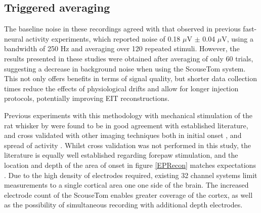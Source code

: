 \subsection{Triggered averaging}
The baseline noise in these recordings agreed with that observed in previous fast-neural activity experiments, which reported noise of 0.18 $\mu$V $\pm$ 0.04 $\mu$V, using a bandwidth of 250 Hz \cite{Oh2011,Packham2016} and averaging over 120 repeated stimuli. However, the results presented in these studies were obtained after averaging of only 60 trials, suggesting a decrease in background noise when using the ScouseTom system. This not only offers benefits in terms of signal quality, but shorter data collection times reduce the effects of physiological drifts and allow for longer injection protocols, potentially improving EIT reconstructions.  

Previous experiments with this methodology with mechanical stimulation of the rat whisker by \citet{Aristovich_2016} were found to be in good agreement with established literature, and cross validated with other imaging techniques both in initial onset \cite{armstrong1991thalamo}, and spread of activity \cite{petersen2007functional}. Whilst cross validation was not performed in this study, the literature is equally well established regarding forepaw stimulation, and the location and depth of the area of onset in figure \ref{EPRecon} matches expectations \cite{peeters2001comparing} \cite{masamoto2007relationship} \cite{lowe2007small}. Due to the high density of electrodes required, existing 32 channel systems limit measurements to a single cortical area one one side of the brain. The increased electrode count of the ScouseTom enables greater coverage of the cortex, as well as the possibility of simultaneous recording with additional depth electrodes. 